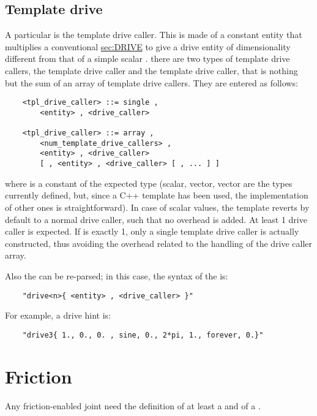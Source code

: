 \subsection{Template drive}\label{sec:TPL-DRIVE}
A particular  is the template drive caller. This is made
of a constant entity that multiplies a conventional 
\hyperref{\kw{drive}}{\kw{drive} (see Section~}{)}{sec:DRIVE} to give a drive
entity of dimensionality different from that of a simple scalar .
there are two types of template drive callers, the  template 
drive caller and the  template drive caller, 
that is nothing but the sum of an array of 
template drive callers. 
They are entered as follows:
\begin{verbatim}
    <tpl_drive_caller> ::= single ,
        <entity> , <drive_caller> 

    <tpl_drive_caller> ::= array ,
        <num_template_drive_callers> ,
        <entity> , <drive_caller>
        [ , <entity> , <drive_caller> [ , ... ] ]
\end{verbatim}
where  is a constant of the expected type (scalar,  
vector,  vector are the types currently defined, but, since 
a C++ template has been used, the implementation of other ones 
is straightforward).
In case of scalar values, the template reverts by default to a normal 
drive caller, such that no overhead is added.
At least 1 drive caller is expected. 
If  is exactly 1, only a single
template drive caller is actually constructed, thus avoiding the overhead 
related to the handling of the drive caller array.    

\noindent
Also the  can be re-parsed; in this case, the syntax
of the  is:
\begin{verbatim}
    "drive<n>{ <entity> , <drive_caller> }"
\end{verbatim}
For example, a  drive hint is:
\begin{verbatim}
    "drive3{ 1., 0., 0. , sine, 0., 2*pi, 1., forever, 0.}"
\end{verbatim}






\section{Friction}
Any friction-enabled joint need the definition of
at least a  and of a .
